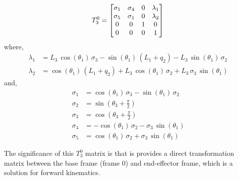 \documentclass[conference]{IEEEtran}
\begin{document}
\[
    T^0_3 =
    \begin{bmatrix}
        \sigma_1  & \sigma_4 & 0 & \lambda_1\\
        \sigma_5 & \sigma_1  & 0 & \lambda_2\\
        0 & 0 & 1 & 0\\
        0 & 0 & 0 & 1
    \end{bmatrix}\\
\]
where,
\begin{align*}
    \lambda_1 &= L_3 \,\cos \left(\theta_1 \right)\,\sigma_3 -\sin \left(\theta_1 \right)\,{\left(L_1 +q_2 \right)}-L_3 \,\sin \left(\theta_1 \right)\,\sigma_2\\
    \lambda_2 &= \cos \left(\theta_1 \right)\,{\left(L_1 +q_2 \right)}+L_3 \,\cos \left(\theta_1 \right)\,\sigma_2 +L_3 \,\sigma_3 \,\sin \left(\theta_1 \right)
\end{align*}
and,
\begin{align*}
    \sigma_1 &=\cos \left(\theta_1 \right)\,\sigma_3 -\sin \left(\theta_1 \right)\,\sigma_2 \\
    \sigma_2 &=\sin \left(\theta_3 +\frac{\pi }{2}\right)\\
    \sigma_3 &=\cos \left(\theta_3 +\frac{\pi }{2}\right)\\
    \sigma_4 &= -\cos \left(\theta_1 \right)\,\sigma_2 -\sigma_3 \,\sin \left(\theta_1 \right)\\
    \sigma_5 &= \cos \left(\theta_1 \right)\,\sigma_2 +\sigma_3 \,\sin \left(\theta_1 \right)
\end{align*}

The significance of this $T^0_3$ matrix is that is provides
a direct transformation matrix between the base frame (frame 0) and end-effector frame, 
which is a solution for forward kinematics.
\end{document}
